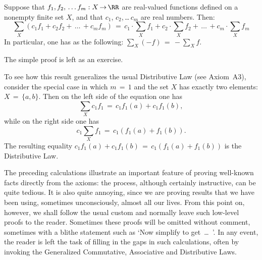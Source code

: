         Suppose that $f_{1},f_{2},\,{\ldots}\,f_{m}:X \,{\rightarrow}\, {\RR}$ are real-valued functions defined on a nonempty finite set $X$,
    and that $c_{1}$, $c_{2}$,\,{\ldots}\,$c_{m}$ are real numbers. Then:
        \begin{equation}
        \label{EqnB.10}
        {\sum}_{X} (c_{1}f_{1} + c_{2}f_{2} + \,{\ldots}\,+ c_{m}f_{m}) \,=\, 
    c_{1}{\cdot}{\sum}_{X} f_{1} + c_{2}{\cdot}{\sum}_{X} f_{2} + \,{\ldots}\,+ c_{m}{\cdot}{\sum}_{X} f_{m}
        \end{equation}
        In particular, one has as the following: ${\sum}_{X} (-f) \,=\, -{\sum}_{X} f$.

\V

        The simple proof is left as an exercise.

\V

        To see how this result generalizes the usual Distributive Law (see Axiom~A3),
    consider the special case in which $m \,=\, 1$ and the set $X$ has exactly two elements: $X \,=\, \{a,b\}$.
    Then on the left side of the equation one has
        \begin{displaymath}
        {\sum}_{X} c_{1}f_{1} \,=\, c_{1}f_{1}(a) + c_{1}f_{1}(b),
        \end{displaymath}
    while on the right side one has
        \begin{displaymath}
        c_{1}{\sum}_{X} f_{1} \,=\, c_{1}(f_{1}(a)+f_{1}(b)).
        \end{displaymath}
    The resulting  equality $c_{1}f_{1}(a) + c_{1}f_{1}(b) \,=\, c_{1}(f_{1}(a)+f_{1}(b))$ is the Distributive Law.

\V
\V

        The preceding calculations illustrate an important feature of proving well-known facts directly from the axioms:
    the process, although certainly instructive, can be quite tedious.
    It is also quite annoying, since we are proving results that we have been using, sometimes unconsciously, almost all our lives.
    From this point on, however, we shall follow the usual custom and normally leave such low-level proofs to the reader.
    Sometimes these proofs will be omitted without comment, sometimes with a blithe statement such as `Now simplify to get \,{\ldots}\, '.
    In any event, the reader is left the task of filling in the gaps in such calculations, often by invoking the Generalized Commutative, Associative and Distributive Laws.
    

\V
\V
\V


